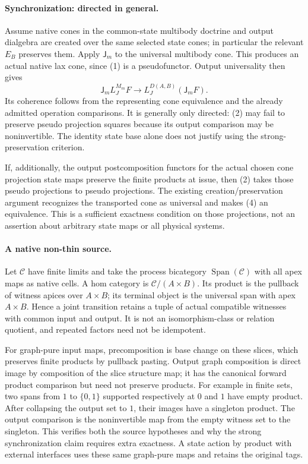 \documentclass{article}
\begin{document}
\paragraph{Synchronization: directed in general.} Assume native cones in the common-state multibody doctrine and output dialgebra are created over the same selected state cones; in particular the relevant $E_B$ preserves them. Apply $\mathsf J_m$ to the universal multibody cone. This produces an actual native lax cone, since (1) is a pseudofunctor. Output universality then gives
\[
 \mathsf J_m L_J^{M_m}F\longrightarrow
 L_J^{D(A,B)}(\mathsf J_mF).
\tag{4}
\]
Its coherence follows from the representing cone equivalence and the already admitted operation comparisons. It is generally only directed: (2) may fail to preserve pseudo projection squares because its output comparison may be noninvertible. The identity state base alone does not justify using the strong-preservation criterion.

If, additionally, the output postcomposition functors for the actual chosen cone projection state maps preserve the finite products at issue, then (2) takes those pseudo projections to pseudo projections. The existing creation/preservation argument recognizes the transported cone as universal and makes (4) an equivalence. This is a sufficient exactness condition on those projections, not an assertion about arbitrary state maps or all physical systems.

\paragraph{A native non-thin source.} Let $\mathcal C$ have finite limits and take the process bicategory $\operatorname{Span}(\mathcal C)$ with all apex maps as native cells. A hom category is $\mathcal C/(A\times B)$. Its product is the pullback of witness apices over $A\times B$; its terminal object is the universal span with apex $A\times B$. Hence a joint transition retains a tuple of actual compatible witnesses with common input and output. It is not an isomorphism-class or relation quotient, and repeated factors need not be idempotent.

For graph-pure input maps, precomposition is base change on these slices, which preserves finite products by pullback pasting. Output graph composition is direct image by composition of the slice structure map; it has the canonical forward product comparison but need not preserve products. For example in finite sets, two spans from $1$ to $\{0,1\}$ supported respectively at $0$ and $1$ have empty product. After collapsing the output set to $1$, their images have a singleton product. The output comparison is the noninvertible map from the empty witness set to the singleton. This verifies both the source hypotheses and why the strong synchronization claim requires extra exactness. A state action by product with external interfaces uses these same graph-pure maps and retains the original tags.
\end{document}
